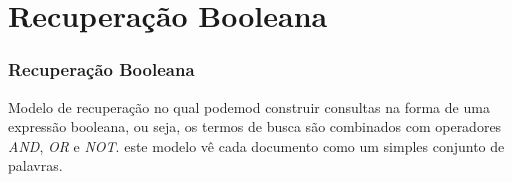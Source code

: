 \documentclass[compress]{beamer}
\begin{document}
\section{Recuperação Booleana}

\begin{frame}[fragile]
\frametitle{Recuperação Booleana}
Modelo de recuperação no qual podemod construir consultas na forma de uma expressão booleana, ou seja, os termos de busca são combinados com operadores \emph{AND}, \emph{OR} e \emph{NOT}. este modelo vê cada documento como um simples conjunto de palavras.
\end{frame}
\end{document}
